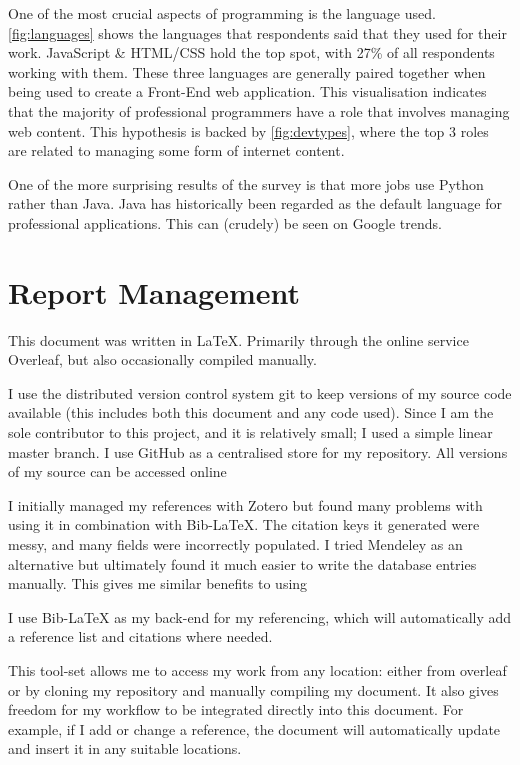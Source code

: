 \documentclass[listof=totoc]{scrartcl}
\begin{document}
One of the most crucial aspects of programming is the language used. \autoref{fig:languages} shows the languages that respondents said that they used for their work. JavaScript \& HTML/CSS hold the top spot, with 27\% of all respondents working with them. These three languages are generally paired together when being used to create a Front-End web application. This visualisation indicates that the majority of professional programmers have a role that involves managing web content. This hypothesis is backed by \autoref{fig:devtypes}, where the top 3 roles are related to managing some form of internet content.

One of the more surprising results of the survey is that more jobs use Python rather than Java. Java has historically been regarded as the default language for professional applications. This can (crudely) be seen on Google trends\cite{TrendsPythonVsJava}.

\section{Report Management}
This document was written in \LaTeX{}\autocite{LaTeX}. Primarily through the online service Overleaf, but also occasionally compiled manually.

I use the distributed version control system git\autocite{git} to keep versions of my source code available (this includes both this document and any code used). Since I am the sole contributor to this project, and it is relatively small; I used a simple linear master branch. I use GitHub as a centralised store for my repository. All versions of my source can be accessed online\autocite{repo}

I initially managed my references with Zotero but found many problems with using it in combination with Bib-\LaTeX{}. The citation keys it generated were messy, and many fields were incorrectly populated. I tried Mendeley as an alternative but ultimately found it much easier to write the database entries manually. This gives me similar benefits to using

I use Bib-\LaTeX{} as my back-end for my referencing, which will automatically add a reference list and citations where needed.

This tool-set allows me to access my work from any location: either from overleaf or by cloning my repository and manually compiling my document. It also gives freedom for my workflow to be integrated directly into this document. For example, if I add or change a reference, the document will automatically update and insert it in any suitable locations.

\printbibliography
\end{document}
